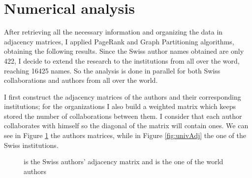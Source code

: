 \documentclass[]{usiinfbachelorproject}
\begin{document}
\section{Numerical analysis}
After retrieving all the necessary information and organizing the data in adjacency matrices, I applied PageRank and Graph Partitioning algorithms, obtaining the following results.
Since the Swiss author names obtained are only 422, I decide to extend the research to the institutions from all over the word, reaching 16425 names. So the analysis is done in parallel for both Swiss collaborations and authors from all over the world.

I first construct the adjacency matrices of the authors and their corresponding institutions; for the organizations I also build a weighted matrix which keeps stored the number of collaborations between them. I consider that each author collaborates with himself so the diagonal of the matrix will contain ones.
We can see in Figure \ref{fig:authorsAdj} the authors matrices, while in Figure \ref{fig:univAdj} the one of the Swiss institutions.

\begin{figure}[tb]
	\centering
	\caption{ is the Swiss authors' adjacency matrix and  is the one of the world authors}
	\label{fig:authorsAdj}
\end{figure}
\end{document}

